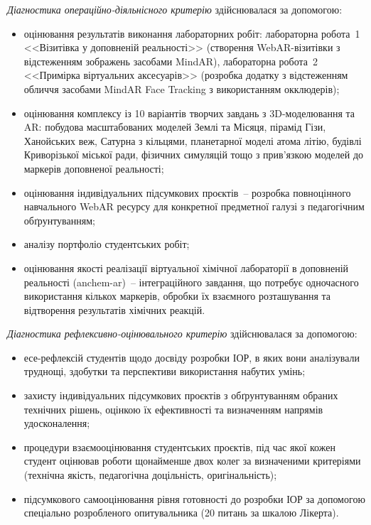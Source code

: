 \textit{Діагностика операційно-діяльнісного критерію} здійснювалася за допомогою:
\begin{itemize}
\item оцінювання результатів виконання лабораторних робіт: лабораторна робота~1 <<Візитівка у доповненій реальності>> (створення WebAR-візитівки з відстеженням зображень засобами MindAR), лабораторна робота~2 <<Примірка віртуальних аксесуарів>> (розробка додатку з відстеженням обличчя засобами MindAR Face Tracking з використанням окклюдерів);
\item оцінювання комплексу із 10 варіантів творчих завдань з 3D-моделювання та AR: побудова масштабованих моделей Землі та Місяця, пірамід Гізи, Ханойських веж, Сатурна з кільцями, планетарної моделі атома літію, будівлі Криворізької міської ради, фізичних симуляцій тощо з прив'язкою моделей до маркерів доповненої реальності;
\item оцінювання індивідуальних підсумкових проєктів~-- розробка повноцінного навчального WebAR ресурсу для конкретної предметної галузі з педагогічним обґрунтуванням;
\item аналізу портфоліо студентських робіт;
\item оцінювання якості реалізації віртуальної хімічної лабораторії в доповненій реальності (anchem-ar)~-- інтеграційного завдання, що потребує одночасного використання кількох маркерів, обробки їх взаємного розташування та відтворення результатів хімічних реакцій.
\end{itemize}

\textit{Діагностика рефлексивно-оцінювального критерію} здійснювалася за допомогою:
\begin{itemize}
\item есе-рефлексій студентів щодо досвіду розробки ІОР, в яких вони аналізували труднощі, здобутки та перспективи використання набутих умінь;
\item захисту індивідуальних підсумкових проєктів з обґрунтуванням обраних технічних рішень, оцінкою їх ефективності та визначенням напрямів удосконалення;
\item процедури взаємооцінювання студентських проєктів, під час якої кожен студент оцінював роботи щонайменше двох колег за визначеними критеріями (технічна якість, педагогічна доцільність, оригінальність);
\item підсумкового самооцінювання рівня готовності до розробки ІОР за допомогою спеціально розробленого опитувальника (20 питань за шкалою Лікерта).
\end{itemize}

